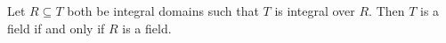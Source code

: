 Let $R \subseteq T$ both be integral domains such that $T$ is integral over $R$. Then
$T$ is a field if and only if $R$ is a field.
